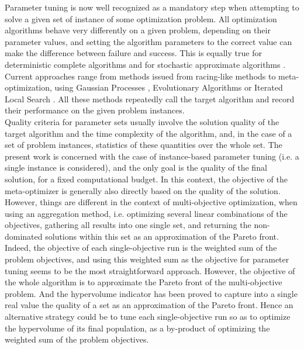 \documentclass{llncs}
\begin{document}
Parameter tuning is now well recognized as a mandatory step when attempting to solve a given set of instance of some optimization problem. All optimization algorithms behave very differently on a given problem, depending on their parameter values, and setting the algorithm parameters to the correct value can make the difference between failure and success. This is equally true for deterministic complete algorithms \cite{HutHooLey10-mipconfig} and for stochastic approximate algorithms \cite{eiben07param,tuningANTS2010}. Current approaches range from methods issued from racing-like methods \cite{Birattari09,Dubois-Lacoste2011} to meta-optimization, using Gaussian Processes \cite{spoCEC05}, Evolutionary Algorithms \cite{NannenE07} or Iterated Local Search \cite{hutter2009paramils}. All  these methods repeatedly call the target algorithm  and record their performance on the given problem instances. \\
\indent Quality criteria for parameter sets usually involve the solution quality of the target algorithm and the time complexity of the algorithm, and, in the case of a set of problem instances, statistics of these quantities over the whole set. The present work is concerned with the case of instance-based parameter tuning (i.e. a single instance is considered), and the only goal is the quality of the final solution, for a fixed computational budget. In this context, the objective of the meta-optimizer is generally also directly based on the quality of the solution.\\
\indent However, things are different in the context of multi-objective optimization, when using an aggregation method, i.e. optimizing several linear combinations of the objectives, gathering all results into one single set, and returning the non-dominated solutions within this set as an approximation of the Pareto front. Indeed, the objective of each single-objective run is the weighted sum of the problem objectives, and using this weighted sum as the objective for parameter tuning seems to be the most straightforward approach. However, the objective of the whole algorithm is to approximate the Pareto front of the multi-objective problem. And the hypervolume indicator \cite{Zitzler2003} has been proved to capture into a single real value the quality of a set as an approximation of the Pareto front. Hence an alternative strategy could be to tune each single-objective run so as to optimize the hypervolume of its final population, as a by-product of optimizing the weighted sum of the problem objectives.
\end{document}
